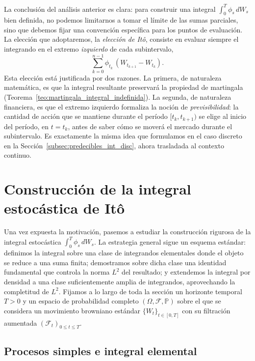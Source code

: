 \documentclass[11pt,a4paper,oneside]{report}
\theoremstyle{plain}
\theoremstyle{definition}
\theoremstyle{remark}
\newcommand{\PP}{\mathbb{P}}
\newcommand{\F}{\mathcal{F}}
\newcommand{\1}{\mathbf{1}}
\begin{document}
La conclusión del análisis
anterior es clara: para construir una integral $\int_0^T \phi_s\, dW_s$
bien definida, no podemos limitarnos a tomar el límite de las sumas
parciales, sino que debemos fijar una convención específica para los
puntos de evaluación. La elección que adoptaremos, la \emph{elección
de Itô}, consiste en evaluar siempre el integrando en el extremo
\emph{izquierdo} de cada subintervalo,
\begin{equation*}
  \sum_{k=0}^{n-1} \phi_{t_k}\, (W_{t_{k+1}} - W_{t_k}).
\end{equation*}
Esta elección está justificada por dos razones. La primera, de naturaleza matemática, es que la integral resultante
preservará la propiedad de martingala
(Teorema~\ref{teo:martingala_integral_indefinida}). La segunda, de naturaleza financiera, es que el extremo
izquierdo formaliza la noción de \emph{previsibilidad}: la cantidad de
acción que se mantiene durante el período $[t_k, t_{k+1})$ se elige al
inicio del período, en $t = t_k$, antes de saber cómo se moverá el
mercado durante el subintervalo. Es exactamente la misma idea que
formulamos en el caso discreto en la
Sección~\ref{subsec:predecibles_int_disc}, ahora trasladada al
contexto continuo.

\section{Construcción de la integral estocástica de Itô}
\label{sec:construccion_ito}

Una vez expuesta la motivación, pasemos a estudiar la construcción rigurosa de la
integral estocástica $\int_0^T \phi_s\, dW_s$. La estrategia general
sigue un esquema estándar: definimos la integral sobre una clase de
integrandos elementales donde el objeto se reduce a una suma finita;
demostramos sobre dicha clase una identidad fundamental que controla
la norma $L^2$ del resultado; y extendemos la integral por densidad a
una clase suficientemente amplia de integrandos, aprovechando la
completitud de $L^2$. Fijamos a lo largo de toda la sección un horizonte temporal $T
> 0$ y un espacio de probabilidad completo $(\Omega, \F, \PP)$
sobre el que se considera un movimiento browniano estándar
$\{W_t\}_{t \in [0, T]}$ con su filtración aumentada $(\F_t)_{0
\le t \le T}$.

\subsection{Procesos simples e integral elemental}
\label{subsec:integral_simples}
\end{document}
